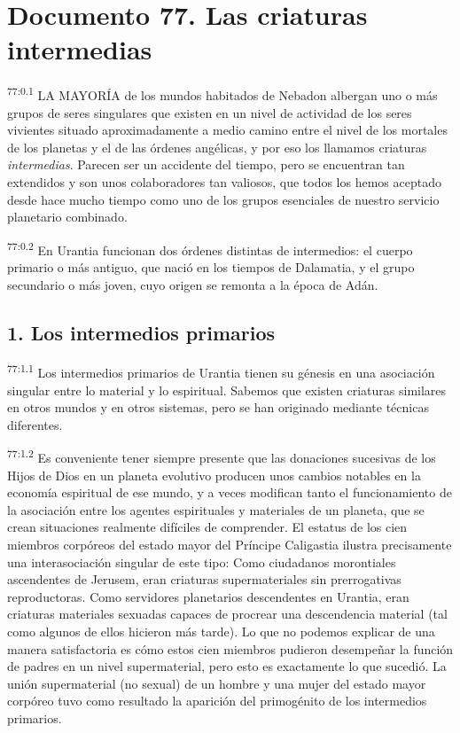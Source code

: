 \chapter{Documento 77. Las criaturas intermedias}
\par
\textsuperscript{77:0.1} LA MAYORÍA de los mundos habitados de Nebadon albergan uno o más grupos de seres singulares que existen en un nivel de actividad de los seres vivientes situado aproximadamente a medio camino entre el nivel de los mortales de los planetas y el de las órdenes angélicas, y por eso los llamamos criaturas \textit{intermedias}. Parecen ser un accidente del tiempo, pero se encuentran tan extendidos y son unos colaboradores tan valiosos, que todos los hemos aceptado desde hace mucho tiempo como uno de los grupos esenciales de nuestro servicio planetario combinado.

\par
\textsuperscript{77:0.2} En Urantia funcionan dos órdenes distintas de intermedios: el cuerpo primario o más antiguo, que nació en los tiempos de Dalamatia, y el grupo secundario o más joven, cuyo origen se remonta a la época de Adán.

\section*{1. Los intermedios primarios}
\par
\textsuperscript{77:1.1} Los intermedios primarios de Urantia tienen su génesis en una asociación singular entre lo material y lo espiritual. Sabemos que existen criaturas similares en otros mundos y en otros sistemas, pero se han originado mediante técnicas diferentes.

\par
\textsuperscript{77:1.2} Es conveniente tener siempre presente que las donaciones sucesivas de los Hijos de Dios en un planeta evolutivo producen unos cambios notables en la economía espiritual de ese mundo, y a veces modifican tanto el funcionamiento de la asociación entre los agentes espirituales y materiales de un planeta, que se crean situaciones realmente difíciles de comprender. El estatus de los cien miembros corpóreos del estado mayor del Príncipe Caligastia ilustra precisamente una interasociación singular de este tipo: Como ciudadanos morontiales ascendentes de Jerusem, eran criaturas supermateriales sin prerrogativas reproductoras. Como servidores planetarios descendentes en Urantia, eran criaturas materiales sexuadas capaces de procrear una descendencia material
(tal como algunos de ellos hicieron más tarde). Lo que no podemos explicar de una manera satisfactoria es cómo estos cien miembros pudieron desempeñar la función de padres en un nivel supermaterial, pero esto es exactamente lo que sucedió. La unión supermaterial (no sexual) de un hombre y una mujer del estado mayor corpóreo tuvo como resultado la aparición del primogénito de los intermedios primarios.

